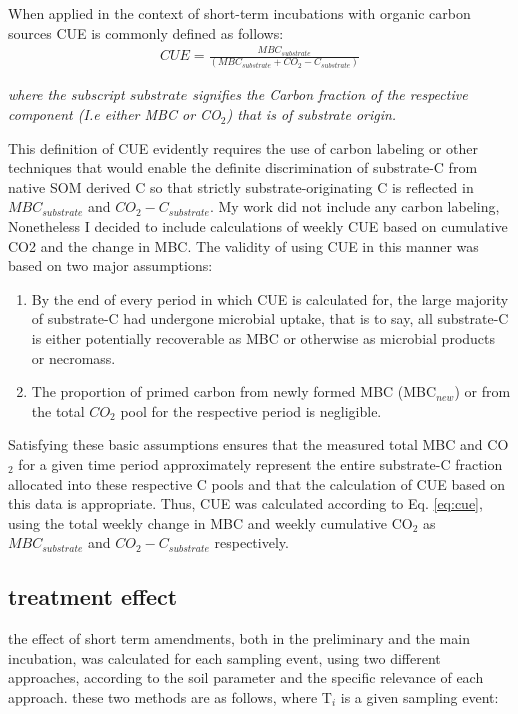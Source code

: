 \documentclass[12pt]{report}
\begin{document}
When applied in the context of short-term incubations with organic carbon sources CUE is commonly defined as follows:\\

\begin{align}
CUE = \frac{MBC_{substrate}}{(MBC_{substrate} + CO_2-C_{substrate})}\label{eq:cue}
\end{align}

\begin{adjustwidth}{50pt}{50pt}
	\begin{footnotesize}
		\textit{where the subscript $ substrate $ signifies the Carbon fraction of the respective component (I.e either MBC or CO$ _2 $) that is of substrate origin. 
		}\\
	\end{footnotesize}
\end{adjustwidth} 
This definition of CUE evidently requires the use of carbon labeling or other techniques that would enable the definite discrimination of substrate-C from native SOM derived C so that strictly substrate-originating C is reflected in $ MBC_{substrate} $ and $ CO_2-C_{substrate} $.
My work did not include any carbon labeling, Nonetheless I decided to include calculations of weekly CUE based on cumulative CO2 and the change in MBC. The validity of using CUE in this manner was based on two major assumptions:\\
\begin{enumerate}
	\item By the end of every period in which CUE is calculated for, the large majority of substrate-C had undergone microbial uptake, that is to say, all substrate-C is either potentially recoverable as MBC or otherwise as microbial products or necromass.
	\item The proportion of primed carbon from newly formed MBC (MBC$ _{new} $) or from the total $ CO_2 $ pool for the respective period is negligible. 
\end{enumerate}
Satisfying these basic assumptions ensures that the measured total MBC and CO$ _2 $  for a given time period approximately represent the entire substrate-C fraction allocated into these respective C pools and that the calculation of CUE based on this data is appropriate. Thus, CUE was calculated according to Eq. \ref{eq:cue}, using the total weekly change in MBC and weekly cumulative CO$ _2 $ as  $MBC_{substrate} $ and $ CO_2-C_{substrate} $ respectively. 




\subsection{treatment effect}
the effect of short term amendments, both in the preliminary and the main incubation, was calculated for each sampling event, using two different approaches, according to the soil parameter and the specific relevance of each approach.
these two methods are as follows, where T$_i$ is a given sampling event: \\
\end{document}
